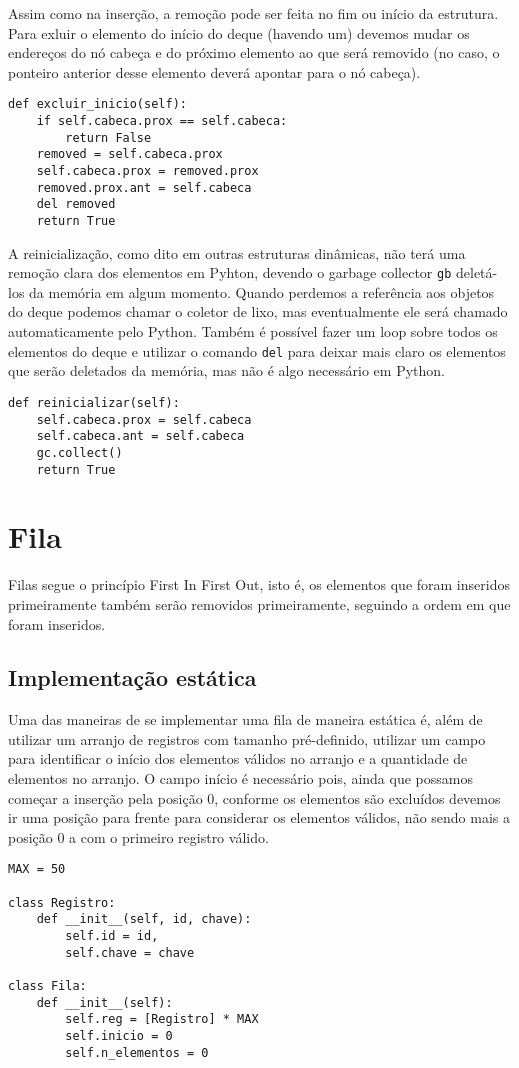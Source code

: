 \documentclass[a4paper, twocolumn]{article}
\theoremstyle{definition}
\begin{document}
Assim como na inserção, a remoção pode ser feita no fim ou início da estrutura. Para exluir o elemento do início do deque (havendo um) devemos mudar os endereços do nó cabeça e do próximo elemento ao que será removido (no caso, o ponteiro anterior desse elemento deverá apontar para o nó cabeça).
\begin{lstlisting}[label=deque_excluir, caption= Deque (remoção no início)]
def excluir_inicio(self):
    if self.cabeca.prox == self.cabeca: 
    	return False
    removed = self.cabeca.prox
    self.cabeca.prox = removed.prox
    removed.prox.ant = self.cabeca
    del removed
    return True
\end{lstlisting}

A reinicialização, como dito em outras estruturas dinâmicas, não terá uma remoção clara dos elementos em Pyhton, devendo o garbage collector \texttt{gb} deletá-los da memória em algum momento. Quando perdemos a referência aos objetos do deque podemos chamar o coletor de lixo, mas eventualmente ele será chamado automaticamente pelo Python. Também é possível fazer um loop sobre todos os elementos do deque e utilizar o comando \texttt{del} para deixar mais claro os elementos que serão deletados da memória, mas não é algo necessário em Python.
\begin{lstlisting}[label=deque_reinicializar, caption= Deque (reinicialização)]
def reinicializar(self):
    self.cabeca.prox = self.cabeca
    self.cabeca.ant = self.cabeca
    gc.collect()
    return True
\end{lstlisting}

\section{Fila}
Filas segue o princípio First In First Out, isto é, os elementos que foram inseridos primeiramente também serão removidos primeiramente, seguindo a ordem em que foram inseridos.

\subsection{Implementação estática}

Uma das maneiras de se implementar uma fila de maneira estática é, além de utilizar um arranjo de registros com tamanho pré-definido, utilizar um campo para identificar o início dos elementos válidos no arranjo e a quantidade de elementos no arranjo. O campo início é necessário pois, ainda que possamos começar a inserção pela posição 0, conforme os elementos são excluídos devemos ir uma posição para frente para considerar os elementos válidos, não sendo mais a posição 0 a com o primeiro registro válido.
\begin{lstlisting}[label=fila_estat_estrutura, caption= Fila estática (estrutura)]
MAX = 50

class Registro:
    def __init__(self, id, chave):
        self.id = id,
        self.chave = chave

class Fila:
    def __init__(self):
        self.reg = [Registro] * MAX
        self.inicio = 0
        self.n_elementos = 0
\end{lstlisting}
\end{document}

